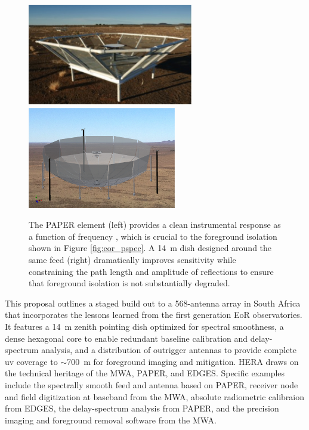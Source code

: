 \documentclass[preprint]{aastex}
\begin{document}
\begin{figure}[!ht]\centering
\includegraphics[height=1.75in]{plots/paper_element.jpg}
\includegraphics[height=1.75in]{plots/hera_dish.png}
\caption{\small
The PAPER element (left) provides a clean instrumental response as a function
of frequency \citep{parsons_et_al2010,parsons_et_al2012b}, which is crucial to
the foreground isolation shown in Figure \ref{fig:eor_pspec}.  A 14~m dish
designed around the same feed (right) dramatically improves sensitivity while
constraining the path length and amplitude of
reflections to ensure that foreground isolation is not substantially degraded.  
}\label{fig:hera_dish}
\end{figure}

This proposal outlines a staged build out to a 568-antenna array in South Africa that incorporates the lessons learned from the first generation EoR observatories. It features a 14~m zenith pointing dish optimized for spectral smoothness, a dense hexagonal core to enable redundant baseline calibration and delay-spectrum analysis, and a distribution of outrigger antennas to provide complete uv coverage to $\sim$700~m for foreground imaging and mitigation. HERA draws on the technical heritage of the MWA, PAPER, and EDGES. Specific examples include the spectrally smooth feed and antenna based on PAPER, receiver node and field digitization at baseband from the MWA, absolute radiometric calibraion from EDGES, the delay-spectrum analysis from PAPER, and the precision imaging and foreground removal software from the MWA.
\end{document}
